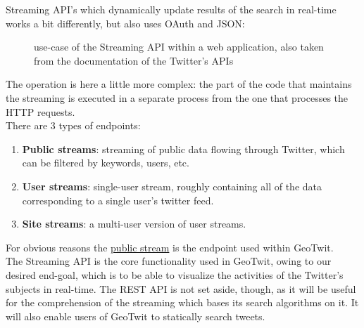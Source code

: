 \documentclass[a4paper,11pt]{report}
\begin{document}
Streaming API's which dynamically update results of the search in real-time works a bit differently, but also uses OAuth and JSON:
\begin{figure}[H]
\vspace{-5pt}
\begin{center}
\vspace{-5pt}
\caption{use-case of the Streaming API within a web application, also taken from the documentation of the Twitter's APIs}
\end{center}
\end{figure}

The operation is here a little more complex: the part of the code that maintains the streaming is executed in a separate process from the one that processes the HTTP requests.\\

There are 3 types of endpoints:
\begin{enumerate}
	\item \textbf{Public streams}: streaming of public data flowing through Twitter, which can be filtered by keywords, users, etc.
	\item \textbf{User streams}: single-user stream, roughly containing all of the data corresponding to a single user's twitter feed.
	\item \textbf{Site streams}: a multi-user version of user streams.
\end{enumerate}

For obvious reasons the \underline{public stream} is the endpoint used within GeoTwit.\\

The Streaming API is the core functionality used in GeoTwit, owing to our desired end-goal, which is to be able to visualize the activities of the Twitter's subjects in real-time. The REST API is not set aside, though, as it will be useful for the comprehension of the streaming which bases its search algorithms on it. It will also enable users of GeoTwit to statically search tweets.
\end{document}
